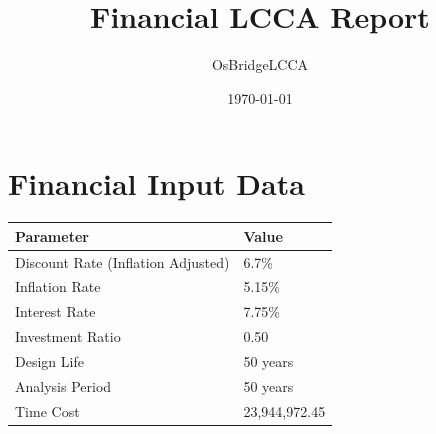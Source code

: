 \documentclass{article}
\title{Financial LCCA Report}
\author{OsBridgeLCCA}
\date{\today}
\begin{document}
\maketitle

\section*{Financial Input Data}

\begin{tabular}{ll}
\toprule
Parameter & Value \\
\midrule
Discount Rate (Inflation Adjusted) & 6.7\% \\
Inflation Rate & 5.15\% \\
Interest Rate & 7.75\% \\
Investment Ratio & 0.50 \\
Design Life & 50 years \\
Analysis Period & 50 years \\
Time Cost & 23,944,972.45 \\
\bottomrule
\end{tabular}
\end{document}
